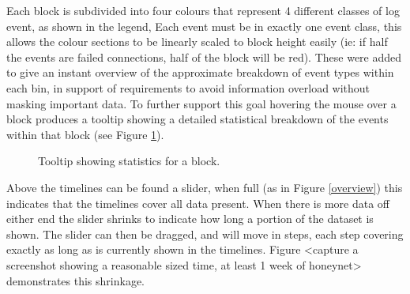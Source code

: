 Each block is subdivided into four colours that represent 4 different classes of log event, as shown in the legend, Each event must be in exactly one event class, this allows the colour sections to be linearly scaled to block height easily (ie: if half the events are failed connections, half of the block will be red). These were added to give an instant overview of the approximate breakdown of event types within each bin, in support of requirements to avoid information overload without masking important data. To further support this goal hovering the mouse over a block produces a tooltip showing a detailed statistical breakdown of the events within that block (see Figure \ref{des_tooltip}). 

\begin{figure}[tbh]
\caption{\protect\label{des_tooltip}Tooltip showing statistics for a block.}
\end{figure}

Above the timelines can be found a slider, when full (as in Figure \ref{overview}) this indicates that the timelines cover all data present. When there is more data off either end the slider shrinks to indicate how long a portion of the dataset is shown. The slider can then be dragged, and will move in steps, each step covering exactly as long as is currently shown in the timelines. Figure <capture a screenshot showing a reasonable sized time, at least 1 week of honeynet> demonstrates this shrinkage. 


